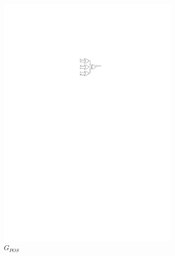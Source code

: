 \begin{figure}[h]
	\centering
	\begin{subfigure}[b]{0.3\textwidth}
		\centering
		\includegraphics[width=\textwidth]{fig/Q1_G_POS.pdf}
		\caption{$G_{POS}$}
		\label{fig:G_POS}
	\end{subfigure}
	\hfil
	\begin{subfigure}[b]{0.3\textwidth}
		\centering

\end{subfigure}
\end{figure}
